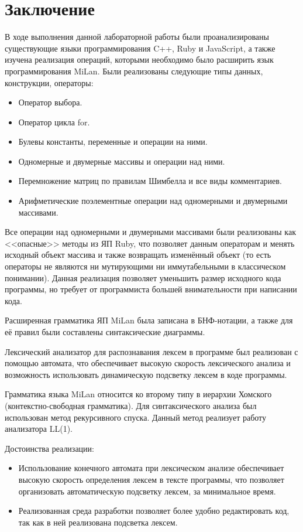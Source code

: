 \documentclass[a4paper,final]{article}
\begin{document}
\newpage
\section*{Заключение}
В ходе выполнения данной лабораторной работы были проанализированы существующие языки программирования C++, Ruby и JavaScript, а также изучена реализация операций, которыми необходимо было расширить язык программирования MiLan. Были реализованы следующие типы данных, конструкции, операторы:
\begin{itemize}
    \item Оператор выбора.
    \item Оператор цикла for.
    \item Булевы константы, переменные и операции на ними.
    \item Одномерные и двумерные массивы и операции над ними.
    \item Перемножение матриц по правилам Шимбелла и все виды комментариев.
    \item Арифметические поэлементные операции над одномерными и двумерными массивами.
\end{itemize}

Все операции над одномерными и двумерными массивами были реализованы как <<опасные>> методы из ЯП Ruby, что позволяет данным операторам и менять исходный объект массива и также возвращать изменённый объект (то есть операторы не являются ни мутирующими ни иммутабельными в классическом понимании). Данная реализация позволяет уменьшить размер исходного кода программы, но требует от программиста большей внимательности при написании кода.

Расширенная грамматика ЯП MiLan была записана в БНФ-нотации, а также для её правил были составлены синтаксические диаграммы.

Лексический анализатор для распознавания лексем в программе был реализован с помощью автомата, что обеспечивает высокую скорость лексического анализа и возможность использовать динамическую подсветку лексем в коде программы. 

Грамматика языка MiLan относится ко второму типу в иерархии Хомского (контекстно-свободная грамматика). Для синтаксического анализа был использован метод рекурсивного спуска. Данный метод реализует работу анализатора LL(1).

Достоинства реализации:
\begin{itemize}
    \item Использование конечного автомата при лексическом анализе обеспечивает высокую скорость определения лексем в тексте программы, что позволяет организовать автоматическую подсветку лексем, за минимальное время.
    \item Реализованная среда разработки позволяет более удобно редактировать код, так как в ней реализована подсветка лексем.
\end{itemize}
\end{document}
